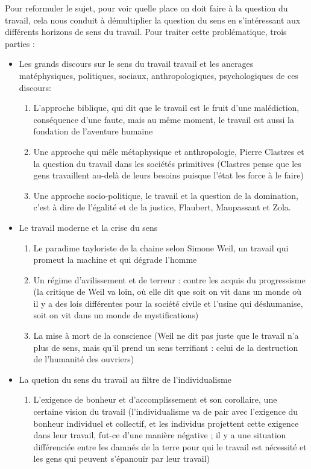 \documentclass[a4paper,12pt]{book}
\begin{document}
\par Pour reformuler le sujet, pour voir quelle place on doit faire à la question du travail, cela nous conduit à démultiplier la question du sens en s'intéressant aux différents horizons de sens du travail. Pour traiter cette problématique, trois parties :\begin{itemize}
\item Les grands discours sur le sens du travail travail et les ancrages matéphysiques, politiques, sociaux, anthropologiques, psychologiques de ces discours:\begin{enumerate}
    \item L'approche biblique, qui dit que le travail est le fruit d'une malédiction, conséquence d'une faute, mais au même moment, le travail est aussi la fondation de l'aventure humaine
    \item Une approche qui mêle métaphysique et anthropologie, Pierre Clastres et la question du travail dans les sociétés primitives (Clastres pense que les gens travaillent au-delà de leurs besoins puisque l'état les force à le faire)
    \item Une approche socio-politique, le travail et la question de la domination, c'est à dire de l'égalité et de la justice, Flaubert, Maupassant et Zola.
\end{enumerate}
\item Le travail moderne et la crise du sens\begin{enumerate}
    \item Le paradime tayloriste de la chaine selon Simone Weil, un travail qui promeut la machine et qui dégrade l'homme
    \item Un régime d'avilissement et de terreur : contre les acquis du progressisme (la critique de Weil va loin, où elle dit que soit on vit dans un monde où il y a des lois différentes pour la société civile et l'usine qui déshumanise, soit on vit dans un monde de mystifications)
    \item La mise à mort de la conscience (Weil ne dit pas juste que le travail n'a plus de sens, mais qu'il prend un sens terrifiant : celui de la destruction de l'humanité des ouvriers)
\end{enumerate}
\item La quetion du sens du travail au filtre de l'individualisme\begin{enumerate}
    \item L'exigence de bonheur et d'accomplissement et son corollaire, une certaine vision du travail (l'individualisme va de pair avec l'exigence du bonheur individuel et collectif, et les individus projettent cette exigence dans leur travail, fut-ce d'une manière négative ; il y a une situation différenciée entre les damnés de la terre pour qui le travail est nécessité et les gens qui peuvent s'épanouir par leur travail)

\end{enumerate}
\end{itemize}
\end{document}
